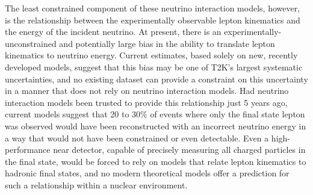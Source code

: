 The least constrained component of these neutrino interaction models, however, is the relationship between the experimentally observable lepton kinematics and the energy of the incident neutrino. At present, there is an experimentally-unconstrained and potentially large bias in the ability to translate lepton kinematics to neutrino energy. Current estimates, based solely on new, recently developed models, suggest that this bias may be one of T2K's largest systematic uncertainties, and no existing dataset can provide a constraint on this uncertainty in a manner that does not rely on neutrino interaction models. Had neutrino interaction models been trusted to provide this relationship just 5 years ago, current models suggest that 20 to 30\% of events where only the final state lepton was observed would have been reconstructed with an incorrect neutrino energy in a way that would not have been constrained or even detectable. Even a high-performance near detector, capable of precisely measuring all charged particles in the final state, would be forced to rely on models that relate lepton kinematics to hadronic final states, and no modern theoretical models offer a prediction for such a relationship within a nuclear environment.


